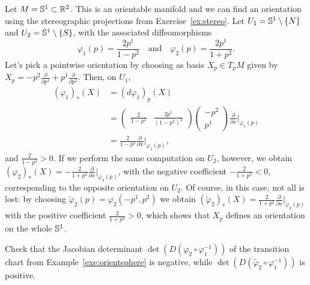 \begin{example}\label{exe:orientsphere}
  Let $M = \mathbb{S}^1\subset \mathbb{R}^2$.
  This is an orientable manifold and we can find an orientation using the stereographic projections from Exercise~\ref{ex:stereo}.
  Let $U_1 = \mathbb{S}^1\setminus\{N\}$ and $U_2 = \mathbb{S}^1\setminus\{S\}$, with the associated diffeomorphisms
  \begin{equation}
    \varphi_1(p) = \frac{2p^1}{1-p^2}
    \quad\mbox{and}\quad
    \varphi_2(p) = \frac{2p^1}{1+p^2}.
  \end{equation}
  Let's pick a pointwise orientation by choosing as basis $X_p\in T_pM$ given by $X_p = -p^2 \frac{\partial}{\partial p^1} + p^1 \frac{\partial}{\partial p^2}$.
  Then, on $U_1$,
  \begin{align}
    (\varphi_1)_*(X) & = (d\varphi_1)_p(X)                                                \\
                     & = \left(\begin{smallmatrix}
                                   \frac{2}{1-p^2} & \frac{2p^1}{(1-p^2)^2}
                                 \end{smallmatrix}\right)
    \left(\begin{smallmatrix}
              -p^2 \\ p^1
            \end{smallmatrix}\right) \frac{\partial}{\partial x}\Big|_{\varphi_1(p)}        \\
                     & = \frac{2}{1-p^2} \frac{\partial}{\partial x}\Big|_{\varphi_1(p)},
  \end{align}
  and $\frac{2}{1-p^2}>0$.
  If we perform the same computation on $U_2$, however, we obtain $(\varphi_2)_*(X) = -\frac{2}{1+p^2}\frac{\partial}{\partial x}\Big|_{\varphi_2(p)}$, with the negative coefficient $-\frac{2}{1+p^2} < 0$, corresponding to the opposite orientation on $U_2$.
  Of course, in this case, not all is lost: by choosing $\widetilde\varphi_2(p) = \varphi_2(-p^1, p^2)$ we obtain $(\widetilde\varphi_2)_*(X) = \frac{2}{1+p^2} \frac{\partial}{\partial x}\Big|_{\widetilde\varphi_2(p)}$ with the positive coefficient $\frac{2}{1+p^2} > 0$, which shows that $X_p$ defines an orientation on the whole $\mathbb{S}^1$.
\end{example}

\begin{exercise}
  Check that the Jacobian determinant $\det(D(\varphi_2\circ \varphi_1^{-1}))$ of the transition chart from Example~\ref{exe:orientsphere} is negative, while $\det(D(\widetilde\varphi_2\circ \varphi_1^{-1}))$ is positive.
\end{exercise}

